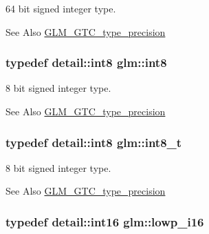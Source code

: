 64 bit signed integer type. \begin{DoxySeeAlso}{See Also}
\hyperlink{group__gtc__type__precision}{G\-L\-M\-\_\-\-G\-T\-C\-\_\-type\-\_\-precision} 
\end{DoxySeeAlso}
\hypertarget{group__gtc__type__precision_ga96254f9c1c4506fc8eb5cf3301ce8565}{
\subsubsection[{int8}]{\setlength{\rightskip}{0pt plus 5cm}typedef detail\-::int8 {\bf glm\-::int8}}}\label{group__gtc__type__precision_ga96254f9c1c4506fc8eb5cf3301ce8565}
8 bit signed integer type. \begin{DoxySeeAlso}{See Also}
\hyperlink{group__gtc__type__precision}{G\-L\-M\-\_\-\-G\-T\-C\-\_\-type\-\_\-precision} 
\end{DoxySeeAlso}
\hypertarget{group__gtc__type__precision_ga673898d450b2a91186f3c4f40c5f8633}{
\subsubsection[{int8\-\_\-t}]{\setlength{\rightskip}{0pt plus 5cm}typedef detail\-::int8 {\bf glm\-::int8\-\_\-t}}}\label{group__gtc__type__precision_ga673898d450b2a91186f3c4f40c5f8633}
8 bit signed integer type. \begin{DoxySeeAlso}{See Also}
\hyperlink{group__gtc__type__precision}{G\-L\-M\-\_\-\-G\-T\-C\-\_\-type\-\_\-precision} 
\end{DoxySeeAlso}
\hypertarget{group__gtc__type__precision_gaf7bbfd31bcec25a416ea94d09efb5451}{
\subsubsection[{lowp\-\_\-i16}]{\setlength{\rightskip}{0pt plus 5cm}typedef detail\-::int16 {\bf glm\-::lowp\-\_\-i16}}}\label{group__gtc__type__precision_gaf7bbfd31bcec25a416ea94d09efb5451}
